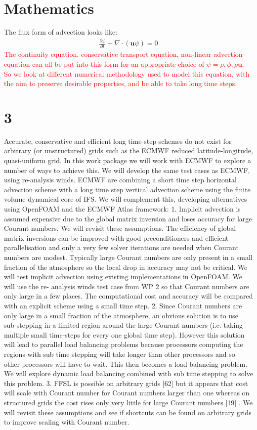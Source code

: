 \documentclass[a4paper,reqno]{elsarticle}
\numberwithin{equation}{section}
\numberwithin{figure}{section}
\def\b{\boldsymbol}
\newcommand{\cred}[1]{\textcolor{red}{#1}}
\begin{document}
\section{Mathematics}
The flux form of advection looks like:
\begin{align*}
\frac{\partial \psi}{\partial t} + \nabla \cdot (\b u \psi) =  0
\end{align*}
\cred{ The continuity equation, conservative transport equation, non-linear advection equation can all be put into this form for an appropriate choice of $\psi = \rho,\phi, \rho \b u$. So we look at different numerical methodology used to model this equation, with the aim to preserve desirable properties, and be able to take long time steps.}
\section{3}
Accurate, conservative and efficient long time-step schemes do not exist for arbitrary (or unstructured)
grids such as the ECMWF reduced latitude-longitude, quasi-uniform grid. In this work package we
will work with ECMWF to explore a number of ways to achieve this. We will develop the same test
cases as ECMWF, using re-analysis winds. ECMWF are combining a short time step horizontal
advection scheme with a long time step vertical advection scheme using the finite volume dynamical
core of IFS. We will complement this, developing alternatives using OpenFOAM and the ECMWF
Atlas framework:
1. 
Implicit advection is assumed expensive due to the global matrix inversion and loses accuracy for
large Courant numbers. We will revisit these assumptions. The efficiency of global matrix inversions
can be improved with good preconditioners and efficient parallelisation and only a very few solver
iterations are needed when Courant numbers are modest. Typically large Courant numbers are
only present in a small fraction of the atmosphere so the local drop in accuracy may not be critical.
We will test implicit advection using existing implementations in OpenFOAM. We will use the re-
analysis winds test case from WP 2 so that Courant numbers are only large in a few places. The
computational cost and accuracy will be compared with an explicit scheme using a small time step.
2.
Since Courant numbers are only large in a small fraction of the atmosphere, an obvious solution is
to use sub-stepping in a limited region around the large Courant numbers (i.e. taking multiple small
time-steps for every one global time step). However this solution will lead to parallel load balancing
problems because processors computing the regions with sub time stepping will take longer than
other processors and so other processors will have to wait. This then becomes a load balancing
problem. We will explore dynamic load balancing combined with sub time stepping to solve this
problem.
3.
FFSL is possible on arbitrary grids
[62]
but it appears that cost will scale with Courant number for
Courant numbers larger than one whereas on structured grids the cost rises only very little for
large Courant numbers
[19]
. We will revisit these assumptions and see if shortcuts can be found on
arbitrary grids to improve scaling with Courant number.
\end{document}
